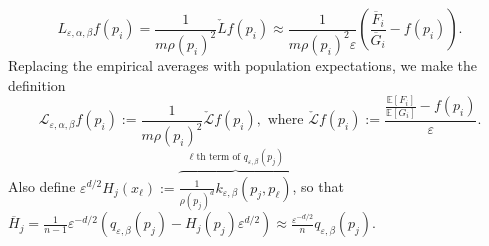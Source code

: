 \documentclass{article}
\theoremstyle{remark}
\theoremstyle{plain}
\begin{document}
$$L_{\varepsilon, \alpha, \beta}f(p_{i})=\frac{1}{ m \rho(p_{i})^{2}} \check{L} f(p_{i}) \approx \frac{1}{m \rho(p_{i})^{2}\varepsilon}\left(  \frac{\overline{F}_{i}}{\overline{G}_{i}}- f(p_{i})  \right).$$
Replacing the empirical averages with population expectations, we make the definition
$$\mathcal{L}_{\varepsilon, \alpha, \beta }f(p_{i}):=\frac{1}{m \rho(p_{i})^{2}} \check{\mathcal{L}}f(p_{i}), \text{ where }\check{\mathcal{L}}f(p_{i}):=\frac{\frac{\mathbb{E}[F_{i}]}{\mathbb{E}[G_{i}]}- f(p_{i})}{\varepsilon}.$$ Also define $\varepsilon^{d/2}H_{j}(x_{\ell}):=\overbrace{  \frac{1}{\rho(p_{j})^{d}} k_{\varepsilon, \beta}(p_{j}, p_{\ell}) }^{ \ell \text{th}  \text{ term  of }q_{\varepsilon, \beta}(p_{j}) }$, so that $\overline{H}_{j}=\frac{1}{n-1} \varepsilon^{-d/2}(q_{\varepsilon, \beta}(p_{j})- H_{j}(p_{j}) \varepsilon^{d/2}) \approx \frac{\varepsilon^{-d/2}}{n}q_{\varepsilon, \beta}(p_{j})$. 
\end{document}

